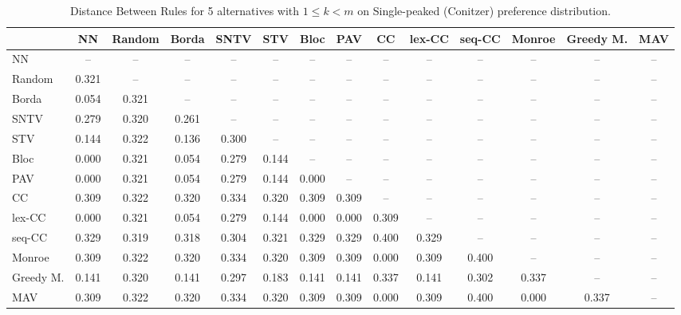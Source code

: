 
\begin{table*}
\centering
\begin{tabular}{lccccccccccccc}
\toprule
 & NN & Random & Borda & SNTV & STV & Bloc & PAV & CC & lex-CC & seq-CC & Monroe & Greedy M. & MAV \\
\midrule
NN & -- & -- & -- & -- & -- & -- & -- & -- & -- & -- & -- & -- & -- \\
Random & 0.321 & -- & -- & -- & -- & -- & -- & -- & -- & -- & -- & -- & -- \\
Borda & 0.054 & 0.321 & -- & -- & -- & -- & -- & -- & -- & -- & -- & -- & -- \\
SNTV & 0.279 & 0.320 & 0.261 & -- & -- & -- & -- & -- & -- & -- & -- & -- & -- \\
STV & 0.144 & 0.322 & 0.136 & 0.300 & -- & -- & -- & -- & -- & -- & -- & -- & -- \\
Bloc & 0.000 & 0.321 & 0.054 & 0.279 & 0.144 & -- & -- & -- & -- & -- & -- & -- & -- \\
PAV & 0.000 & 0.321 & 0.054 & 0.279 & 0.144 & 0.000 & -- & -- & -- & -- & -- & -- & -- \\
CC & 0.309 & 0.322 & 0.320 & 0.334 & 0.320 & 0.309 & 0.309 & -- & -- & -- & -- & -- & -- \\
lex-CC & 0.000 & 0.321 & 0.054 & 0.279 & 0.144 & 0.000 & 0.000 & 0.309 & -- & -- & -- & -- & -- \\
seq-CC & 0.329 & 0.319 & 0.318 & 0.304 & 0.321 & 0.329 & 0.329 & 0.400 & 0.329 & -- & -- & -- & -- \\
Monroe & 0.309 & 0.322 & 0.320 & 0.334 & 0.320 & 0.309 & 0.309 & 0.000 & 0.309 & 0.400 & -- & -- & -- \\
Greedy M. & 0.141 & 0.320 & 0.141 & 0.297 & 0.183 & 0.141 & 0.141 & 0.337 & 0.141 & 0.302 & 0.337 & -- & -- \\
MAV & 0.309 & 0.322 & 0.320 & 0.334 & 0.320 & 0.309 & 0.309 & 0.000 & 0.309 & 0.400 & 0.000 & 0.337 & -- \\
\bottomrule
\end{tabular}

\caption{Distance Between Rules for 5 alternatives with $1 \leq k < m$ on Single-peaked (Conitzer) preference distribution.}
\end{table*}
